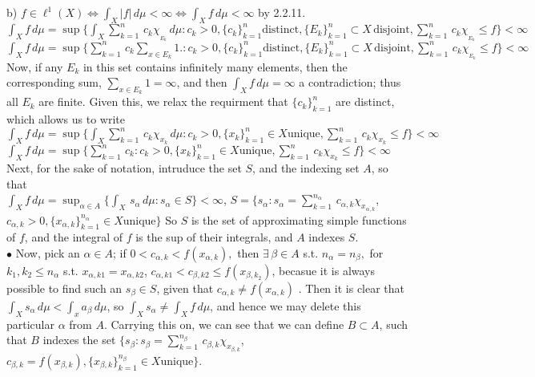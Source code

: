 \documentclass[12pt]{article}
\begin{document}
\begin{flushleft}
b) $f \in \ell^1(X) \Leftrightarrow  \int_X  |f| \, d \mu < \infty \Leftrightarrow  \int_X  f \, d \mu < \infty $ by 2.2.11.\\
$ \int_X  f \, d \mu  = \sup \{ \int_X  \sum_{k=1}^n \, c_k \chi_{_{E_k}} \, d \mu: c_k>0, \{ c_k \}_{k=1}^n \textrm{distinct},  \{ E_k \}_{k=1}^n \subset X \,\textrm{disjoint},   \sum_{k=1}^n \, c_k \chi_{_{E_k}}  \le f   \} < \infty   $ \\
$ \int_X  f \, d \mu  = \sup \{ \sum_{k=1}^n \, c_k \sum_{x \in {E_k}} 1.: c_k>0, \{ c_k \}_{k=1}^n \textrm{distinct},  \{ E_k \}_{k=1}^n \subset X \, \textrm{disjoint},   \sum_{k=1}^n \, c_k \chi_{_{E_k}}  \le f   \} < \infty   $ \\
Now, if any $E_k$ in this set contains infinitely many elements, then the corresponding sum, $\sum_{x \in {E_k}} 1 = \infty$, and then $  \int_X  f \, d \mu = \infty$  a contradiction; thus all $E_k$ are finite. Given this, we relax the requirment that $\{ c_k \}_{k=1}^n$ are distinct, which allows us to write\\
$ \int_X  f \, d \mu  = \sup \{ \int_X  \sum_{k=1}^n \, c_k \chi_{x_k} \, d \mu: c_k>0, \{ x_k \}_{k=1}^n \in X \textrm{unique},    \sum_{k=1}^n \, c_k \chi_{x_k}  \le f   \} < \infty   $ \\
$ \int_X  f \, d \mu  = \sup \{ \sum_{k=1}^n \, c_k  : c_k>0, \{ x_k \}_{k=1}^n \in X \textrm{unique},     \sum_{k=1}^n \, c_k \chi_{x_k}  \le f   \} < \infty   $ \\
Next, for the sake of notation, intruduce the set $S$, and the indexing set $A$, so that\\
$ \int_X  f \, d \mu  = \sup_{\alpha \in A } \{ \int_X \, s_\alpha \, d \mu: s_\alpha \in S \} < \infty $, $S = \{ s_\alpha : s_\alpha =  \sum_{k=1}^{n_\alpha} \, c_{\alpha,k} \chi_{x_{\alpha,k}}$, $c_{\alpha,k}>0, \{ x_{\alpha,k} \}_{k=1}^{n_\alpha} \in X \textrm{unique} \}$ So $S$ is the set of approximating simple functions of $f$, and the integral of $f$ is the sup of their integrals, and $A$ indexes $S$. \\
$\bullet$ Now, pick an $\alpha \in A$; if $0 < c_{\alpha,k} < f(x_{\alpha,k}), $ then $\exists \, \beta \in A$ s.t. $n_\alpha = n_\beta,$ for $k_1,k_2 \le n_\alpha$ s.t. $x_{\alpha,k1}= x_{\alpha,k2}$, $c_{\alpha,k1} < c_{\beta,k2} \le f(x_{\beta,k_2})$, becasue it is always possible to find such an $s_\beta \in S$, given that $c_{\alpha,k} \not =  f(x_{\alpha,k})$ . 
Then it is clear that $\int_X s_\alpha  \, d \mu < \int_x a_\beta \, d \mu$, so $\int_X s_\alpha \not =  \int_X  f \, d \mu$, and hence we may delete this particular $\alpha$ from $A$.
Carrying this on, we can see that we can define $B \subset A$, such that $B$ indexes the set $\{ s_\beta : s_\beta =  \sum_{k=1}^{n_\beta} \, c_{\beta,k} \chi_{x_{\beta,k}}$, $c_{\beta,k} = f(x_{\beta,k}), \{ x_{\beta,k} \}_{k=1}^{n_\beta} \in X \textrm{unique}  \}$.


\end{flushleft}
\end{document}
